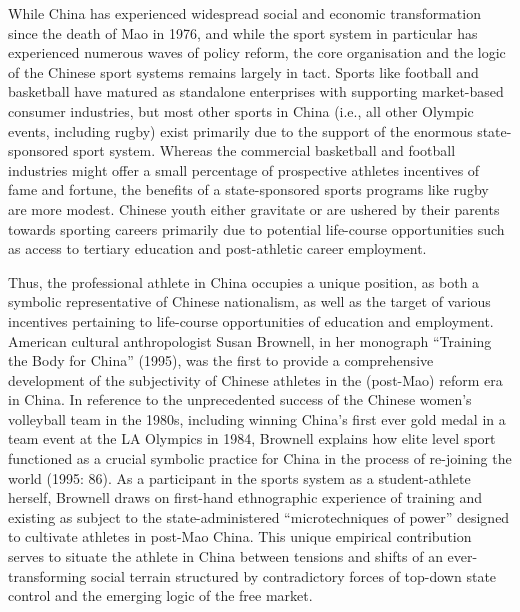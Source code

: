 \begin{CJK}{UTF8}{gbsn}
While China has experienced widespread social and economic transformation since the death of Mao in 1976, and while the sport system in particular has experienced numerous waves of policy reform,  the core organisation and the logic of the Chinese sport systems remains largely in tact.  Sports like football and basketball have matured as standalone enterprises with supporting market-based consumer industries, but most other sports in China (i.e., all other Olympic events, including rugby) exist primarily due to the support of the enormous state-sponsored sport system.  Whereas the commercial basketball and football industries might offer a small percentage of prospective athletes incentives of fame and fortune, the benefits of a state-sponsored sports programs like rugby are more modest.  Chinese youth either gravitate or are ushered by their parents towards sporting careers primarily due to potential life-course opportunities such as access to tertiary education and post-athletic career employment.

Thus, the professional athlete in China occupies a unique position, as both a symbolic representative of Chinese nationalism, as well as the target of various incentives pertaining to life-course opportunities of education and employment.  American cultural anthropologist Susan Brownell, in her monograph ``Training the Body for China'' (1995), was the first to provide a comprehensive development of the subjectivity of Chinese athletes in the (post-Mao) reform era in China.  In reference to the unprecedented success of the Chinese women's volleyball team in the 1980s, including winning China's first ever gold medal in a team event at the LA Olympics in 1984, Brownell explains how elite level sport functioned as a crucial symbolic practice for China in the process of re-joining the world (1995: 86).  As a participant in the sports system as a student-athlete herself, Brownell draws on first-hand ethnographic experience of training and existing as subject to the state-administered ``microtechniques of power'' \citep[citing][]{Foucault1977} designed to cultivate athletes in post-Mao China.  This unique empirical contribution serves to situate the athlete in China between tensions and shifts of an ever-transforming social terrain structured by contradictory forces of top-down state control and the emerging logic of the free market.


\end{CJK}
